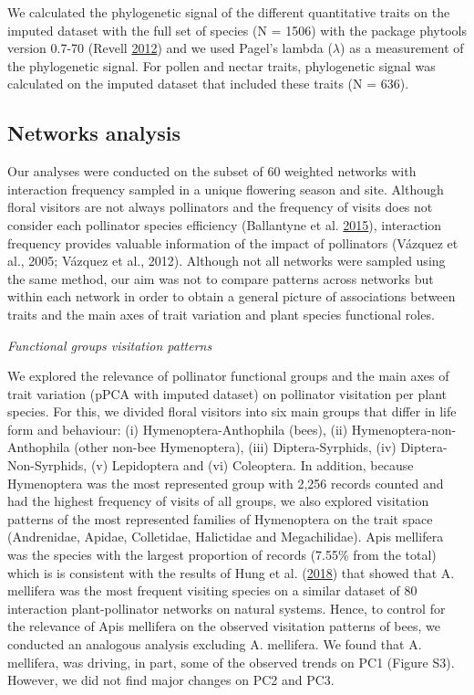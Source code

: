 \documentclass[12pt,a4paper,]{article}
\begin{document}
We calculated the phylogenetic signal of the different quantitative
traits on the imputed dataset with the full set of species (N = 1506)
with the package phytools version 0.7-70 (Revell
\protect\hyperlink{ref-revell2012}{2012}) and we used Pagel's lambda
(\(\lambda\)) as a measurement of the phylogenetic signal. For pollen
and nectar traits, phylogenetic signal was calculated on the imputed
dataset that included these traits (N = 636).

\subsection{Networks analysis}\label{networks-analysis}

Our analyses were conducted on the subset of 60 weighted networks with
interaction frequency sampled in a unique flowering season and site.
Although floral visitors are not always pollinators and the frequency of
visits does not consider each pollinator species efficiency (Ballantyne
et al. \protect\hyperlink{ref-ballantyne2015}{2015}), interaction
frequency provides valuable information of the impact of pollinators
(Vázquez et al., 2005; Vázquez et al., 2012). Although not all networks
were sampled using the same method, our aim was not to compare patterns
across networks but within each network in order to obtain a general
picture of associations between traits and the main axes of trait
variation and plant species functional roles.

\emph{Functional groups visitation patterns}

We explored the relevance of pollinator functional groups and the main
axes of trait variation (pPCA with imputed dataset) on pollinator
visitation per plant species. For this, we divided floral visitors into
six main groups that differ in life form and behaviour: (i)
Hymenoptera-Anthophila (bees), (ii) Hymenoptera-non-Anthophila (other
non-bee Hymenoptera), (iii) Diptera-Syrphids, (iv) Diptera-Non-Syrphids,
(v) Lepidoptera and (vi) Coleoptera. In addition, because Hymenoptera
was the most represented group with 2,256 records counted and had the
highest frequency of visits of all groups, we also explored visitation
patterns of the most represented families of Hymenoptera on the trait
space (Andrenidae, Apidae, Colletidae, Halictidae and Megachilidae).
Apis mellifera was the species with the largest proportion of records
(7.55\% from the total) which is is consistent with the results of Hung
et al. (\protect\hyperlink{ref-hung2018}{2018}) that showed that A.
mellifera was the most frequent visiting species on a similar dataset of
80 interaction plant-pollinator networks on natural systems. Hence, to
control for the relevance of Apis mellifera on the observed visitation
patterns of bees, we conducted an analogous analysis excluding A.
mellifera. We found that A. mellifera, was driving, in part, some of the
observed trends on PC1 (Figure S3). However, we did not find major
changes on PC2 and PC3.
\end{document}
